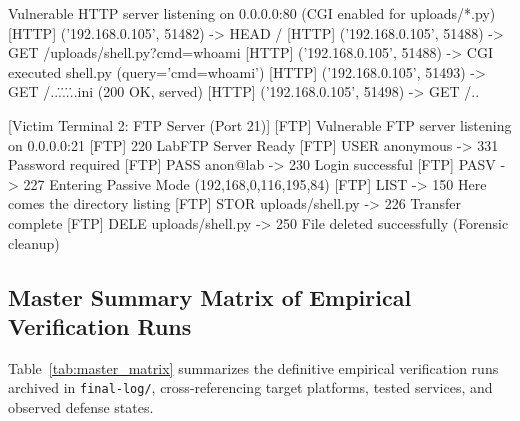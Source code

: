 \begin{logbox}
 Vulnerable HTTP server listening on 0.0.0.0:80 (CGI enabled for uploads/*.py)
[HTTP] ('192.168.0.105', 51482) -> HEAD /
[HTTP] ('192.168.0.105', 51488) -> GET /uploads/shell.py?cmd=whoami
[HTTP] ('192.168.0.105', 51488) -> CGI executed shell.py (query='cmd=whoami')
[HTTP] ('192.168.0.105', 51493) -> GET /..\..\..\..\..\windows\win.ini  (200 OK, served)
[HTTP] ('192.168.0.105', 51498) -> GET /..%

[Victim Terminal 2: FTP Server (Port 21)]
[FTP] Vulnerable FTP server listening on 0.0.0.0:21
[FTP] 220 LabFTP Server Ready
[FTP] USER anonymous -> 331 Password required
[FTP] PASS anon@lab -> 230 Login successful
[FTP] PASV -> 227 Entering Passive Mode (192,168,0,116,195,84)
[FTP] LIST -> 150 Here comes the directory listing
[FTP] STOR uploads/shell.py -> 226 Transfer complete
[FTP] DELE uploads/shell.py -> 250 File deleted successfully (Forensic cleanup)
\end{logbox}

\subsection{Master Summary Matrix of Empirical Verification Runs}
Table~\ref{tab:master_matrix} summarizes the definitive empirical verification runs archived in
\texttt{final-log/}, cross-referencing target platforms, tested services, and observed defense states.


